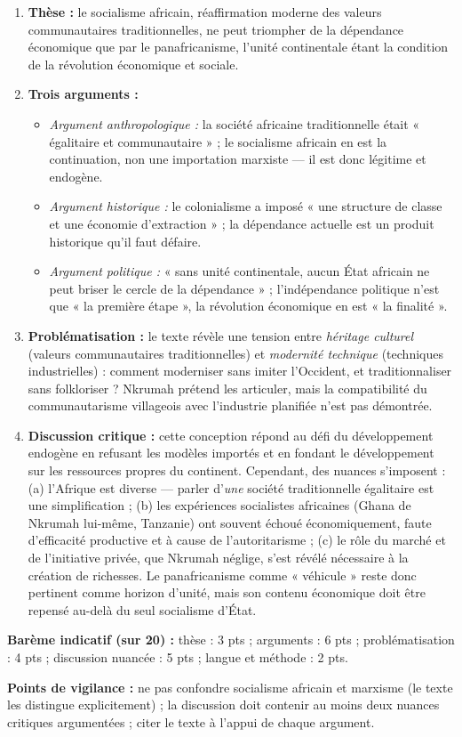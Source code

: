 \documentclass[11pt]{article}
\begin{document}
\begin{corrige}
\begin{enumerate}
\item \textbf{Thèse :} le socialisme africain, réaffirmation moderne des valeurs communautaires traditionnelles, ne peut triompher de la dépendance économique que par le panafricanisme, l'unité continentale étant la condition de la révolution économique et sociale.
\item \textbf{Trois arguments :}
\begin{itemize}
\item \emph{Argument anthropologique :} la société africaine traditionnelle était « égalitaire et communautaire » ; le socialisme africain en est la continuation, non une importation marxiste — il est donc légitime et endogène.
\item \emph{Argument historique :} le colonialisme a imposé « une structure de classe et une économie d'extraction » ; la dépendance actuelle est un produit historique qu'il faut défaire.
\item \emph{Argument politique :} « sans unité continentale, aucun État africain ne peut briser le cercle de la dépendance » ; l'indépendance politique n'est que « la première étape », la révolution économique en est « la finalité ».
\end{itemize}
\item \textbf{Problématisation :} le texte révèle une tension entre \emph{héritage culturel} (valeurs communautaires traditionnelles) et \emph{modernité technique} (techniques industrielles) : comment moderniser sans imiter l'Occident, et traditionnaliser sans folkloriser ? Nkrumah prétend les articuler, mais la compatibilité du communautarisme villageois avec l'industrie planifiée n'est pas démontrée.
\item \textbf{Discussion critique :} cette conception répond au défi du développement endogène en refusant les modèles importés et en fondant le développement sur les ressources propres du continent. Cependant, des nuances s'imposent : (a) l'Afrique est diverse — parler d'\emph{une} société traditionnelle égalitaire est une simplification ; (b) les expériences socialistes africaines (Ghana de Nkrumah lui-même, Tanzanie) ont souvent échoué économiquement, faute d'efficacité productive et à cause de l'autoritarisme ; (c) le rôle du marché et de l'initiative privée, que Nkrumah néglige, s'est révélé nécessaire à la création de richesses. Le panafricanisme comme « véhicule » reste donc pertinent comme horizon d'unité, mais son contenu économique doit être repensé au-delà du seul socialisme d'État.
\end{enumerate}
\textbf{Barème indicatif (sur 20) :} thèse : 3 pts ; arguments : 6 pts ; problématisation : 4 pts ; discussion nuancée : 5 pts ; langue et méthode : 2 pts.

\textbf{Points de vigilance :} ne pas confondre socialisme africain et marxisme (le texte les distingue explicitement) ; la discussion doit contenir au moins deux nuances critiques argumentées ; citer le texte à l'appui de chaque argument.
\end{corrige}
\end{document}
